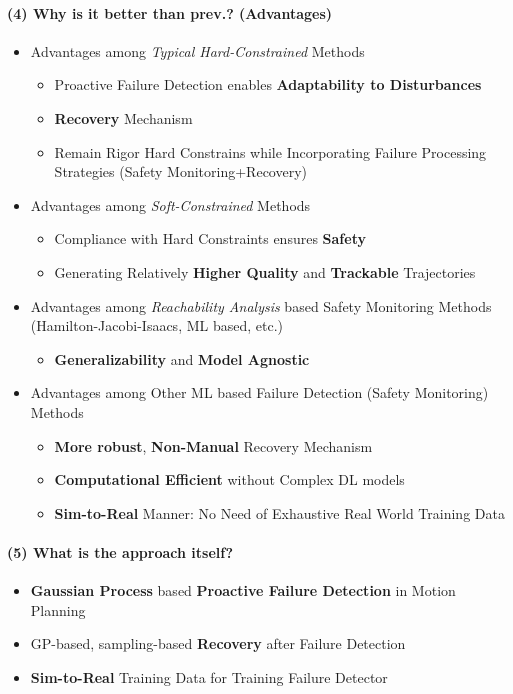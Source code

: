 \documentclass{article}
\begin{document}
\paragraph{(4) Why is it better than prev.? (Advantages)} 
\begin{itemize}
  \item Advantages among \textit{Typical Hard-Constrained} Methods
  \begin{itemize}
    \item Proactive Failure Detection enables \textbf{Adaptability to Disturbances}
    \item \textbf{Recovery} Mechanism
    \item Remain Rigor Hard Constrains while Incorporating Failure Processing Strategies (Safety Monitoring+Recovery)
  \end{itemize}
  \item Advantages among \textit{Soft-Constrained} Methods
  \begin{itemize}
    \item Compliance with Hard Constraints ensures \textbf{Safety}
    \item Generating Relatively \textbf{Higher Quality} and \textbf{Trackable} Trajectories
  \end{itemize}
  \item Advantages among \textit{Reachability Analysis} based Safety Monitoring Methods (Hamilton-Jacobi-Isaacs, ML based, etc.)
  \begin{itemize}
    \item \textbf{Generalizability} and \textbf{Model Agnostic}
  \end{itemize}
  \item Advantages among Other ML based Failure Detection (Safety Monitoring) Methods
  \begin{itemize}
    \item \textbf{More robust}, \textbf{Non-Manual} Recovery Mechanism
    \item \textbf{Computational Efficient} without Complex DL models
    \item \textbf{Sim-to-Real} Manner: No Need of Exhaustive Real World Training Data
  \end{itemize}
\end{itemize}

\paragraph{(5) What is the approach itself?}
\begin{itemize}
  \item \textbf{Gaussian Process} based \textbf{Proactive Failure Detection} in Motion Planning
  \item GP-based, sampling-based \textbf{Recovery} after Failure Detection
  \item \textbf{Sim-to-Real} Training Data for Training Failure Detector
\end{itemize}
\end{document}
